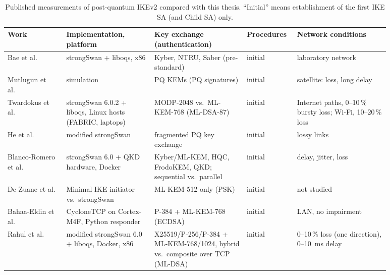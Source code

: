 \begin{table}[!h] \centering
    \footnotesize
    \caption{Published measurements of post-quantum IKEv2 compared with this
    thesis. ``Initial'' means establishment of the first IKE SA (and Child SA)
    only.}
    \label{tab:relwork}
    \begin{tabular}{| p{0.14\linewidth} | p{0.21\linewidth} | p{0.22\linewidth} | p{0.09\linewidth} | p{0.22\linewidth} |} \hline
        Work & Implementation, platform & Key exchange (authentication) & Procedures & Network conditions \\ \hline\hline
        Bae et al.~\cite{bae2023}
            & strongSwan + liboqs, x86
            & Kyber, NTRU, Saber (pre-standard)
            & initial
            & laboratory network \\ \hline
        Mutlugun et al.~\cite{mutlugun2024}
            & simulation
            & PQ KEMs (PQ signatures)
            & initial
            & satellite: loss, long delay \\ \hline
        Twardokus et al.~\cite{twardokus2025}
            & strongSwan 6.0.2 + liboqs, Linux hosts (FABRIC, laptops)
            & MODP-2048 vs.\ ML-KEM-768 (ML-DSA-87)
            & initial
            & Internet paths, 0--10\,\% bursty loss; Wi-Fi, 10--20\,\% loss \\ \hline
        He et al.~\cite{he2025}
            & modified strongSwan
            & fragmented PQ key exchange
            & initial
            & lossy links \\ \hline
        Blanco-Romero et al.~\cite{blancoromero2025}
            & strongSwan 6.0 + QKD hardware, Docker
            & Kyber/ML-KEM, HQC, FrodoKEM, QKD; sequential vs.\ parallel
            & initial
            & delay, jitter, loss \\ \hline
        De Zuane et al.~\cite{dezuane2026}
            & Minimal IKE initiator vs.\ strongSwan
            & ML-KEM-512 only (PSK)
            & initial
            & not studied \\ \hline
        Bahaa-Eldin et al.~\cite{bahaaeldin2026}
            & CycloneTCP on Cortex-M4F, Python responder
            & P-384 + ML-KEM-768 (ECDSA)
            & initial
            & LAN, no impairment \\ \hline
        Rahul et al.~\cite{rahul2026}
            & modified strongSwan 6.0 + liboqs, Docker, x86
            & X25519/P-256/P-384 + ML-KEM-768/1024, hybrid vs.\ composite over TCP (ML-DSA)
            & initial
            & 0--10\,\% loss (one direction), 0--10~ms delay \\ \hline

\end{tabular}
\end{table}
